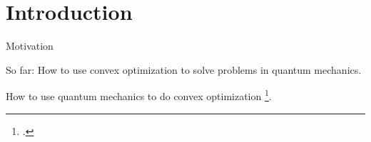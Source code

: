 \section*{Introduction}

\begin{frame}{Motivation}
 
\alert{So far:} How to use convex optimization to solve problems in quantum mechanics.

\vspace{\floatsep}

 How to use quantum mechanics to do convex optimization \footcite{brandao_quantum_2016,van_apeldoorn_quantum_2017}.

\end{frame}
